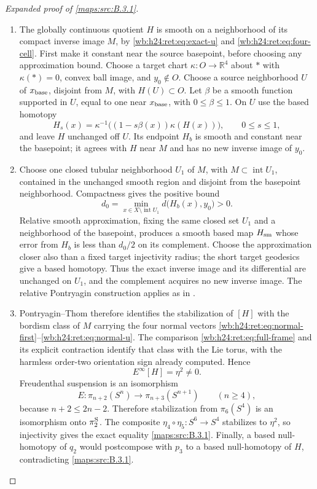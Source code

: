 \begin{proof}[Expanded proof of \cref{maps:src:B.3.1}]
\begin{enumerate}[label=\arabic*.,leftmargin=*]
\item The globally continuous quotient \(H\) is smooth on a neighborhood
of its compact inverse image \(M\), by
\eqref{wb:h24:ret:eq:exact-u} and \eqref{wb:h24:ret:eq:four-cell}. First make it constant
near the source basepoint, before choosing any approximation bound.
Choose a target chart \(\kappa:O\to\mathbb R^4\) about \(*\) with
\(\kappa(*)=0\), convex ball image, and \(y_0\notin O\).
Choose a source neighborhood \(U\) of \(x_{\rm base}\), disjoint
from \(M\), with \(H(U)\subset O\). Let \(\beta\) be a smooth
function supported in \(U\), equal to one near \(x_{\rm base}\),
with \(0\leq\beta\leq1\). On \(U\) use the based homotopy
\[
 H_s(x)=\kappa^{-1}\bigl((1-s\beta(x))\kappa(H(x))\bigr),
 \qquad 0\leq s\leq1,
\]
and leave \(H\) unchanged off \(U\). Its endpoint \(H_b\) is
smooth and constant near the basepoint; it agrees with \(H\)
near \(M\) and has no new inverse image of \(y_0\).

\item Choose one closed tubular neighborhood \(U_1\) of \(M\), with
\(M\subset\operatorname{int}U_1\), contained in the unchanged
smooth region and disjoint from the basepoint neighborhood.
Compactness gives the positive bound
\[
 d_0=\min_{x\in X\setminus\operatorname{int}U_1}
             d\bigl(H_b(x),y_0\bigr)>0.
\]
Relative smooth approximation, fixing the same closed set \(U_1\)
and a neighborhood of the basepoint, produces a smooth based map
\(H_{\rm sm}\) whose error from \(H_b\) is less than \(d_0/2\)
on its complement. Choose the approximation closer also than a
fixed target injectivity radius; the short target geodesics give a
based homotopy. Thus the exact inverse image and its differential
are unchanged on \(U_1\), and the complement acquires no new
inverse image. The relative Pontryagin construction applies as in
\cite[\S7, Theorem B and Lemma 4, pp.~43, 48--50]{CuspNullMilnor1965}.

\item Pontryagin--Thom therefore identifies the stabilization of
\([H]\) with the bordism class of \(M\) carrying the four normal
vectors \eqref{wb:h24:ret:eq:normal-first}--\eqref{wb:h24:ret:eq:normal-u}.  The comparison
\eqref{wb:h24:ret:eq:full-frame} and its explicit contraction identify that
class with the Lie torus, with the harmless order-two orientation
sign already computed.  Hence
\[
 E^\infty[H]=\eta^2\ne0.
\]
Freudenthal suspension is an isomorphism
\[
 E:\pi_{n+2}(S^n)\longrightarrow\pi_{n+3}(S^{n+1})
 \qquad(n\geq4),
\]
because \(n+2\leq2n-2\).  Therefore stabilization from
\(\pi_6(S^4)\) is an isomorphism onto \(\pi_2^{\rm S}\).
The composite \(\eta_4\circ\eta_5:S^6\to S^4\) stabilizes to
\(\eta^2\), so injectivity gives the exact equality
\cref{maps:src:B.3.1}.  Finally, a based null-homotopy of \(q_2\)
would postcompose with \(p_3\) to a based null-homotopy of \(H\),
contradicting \cref{maps:src:B.3.1}.
\end{enumerate}
\end{proof}

